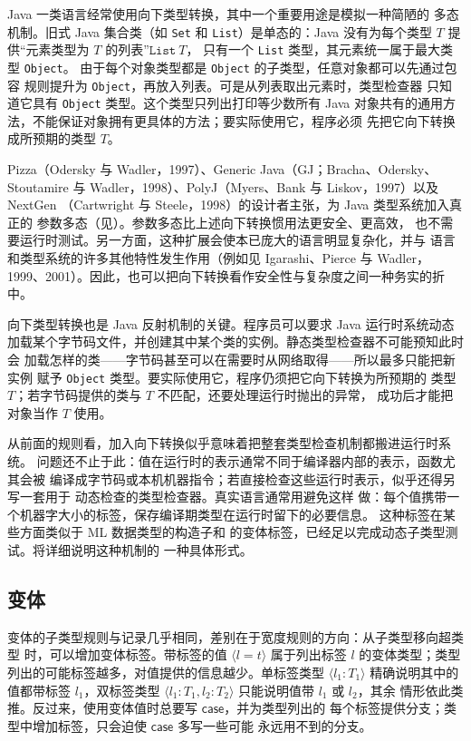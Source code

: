 Java 一类语言经常使用向下类型转换，其中一个重要用途是模拟一种简陋的
多态机制。旧式 Java 集合类（如 \texttt{Set} 和 \texttt{List}）是单态的：Java
没有为每个类型 \(T\) 提供“元素类型为 \(T\) 的列表”\(\texttt{List}\ T\)，
只有一个 \texttt{List} 类型，其元素统一属于最大类型 \texttt{Object}。
由于每个对象类型都是 \texttt{Object} 的子类型，任意对象都可以先通过包容
规则提升为 \texttt{Object}，再放入列表。可是从列表取出元素时，类型检查器
只知道它具有 \texttt{Object} 类型。这个类型只列出打印等少数所有 Java
对象共有的通用方法，不能保证对象拥有更具体的方法；要实际使用它，程序必须
先把它向下转换成所预期的类型 \(T\)。

Pizza（Odersky 与 Wadler，1997）、Generic Java（GJ；Bracha、Odersky、
Stoutamire 与 Wadler，1998）、PolyJ（Myers、Bank 与 Liskov，1997）以及 NextGen
（Cartwright 与 Steele，1998）的设计者主张，为 Java 类型系统加入真正的
参数多态（见）。参数多态比上述向下转换惯用法更安全、更高效，
也不需要运行时测试。另一方面，这种扩展会使本已庞大的语言明显复杂化，并与
语言和类型系统的许多其他特性发生作用（例如见 Igarashi、Pierce 与 Wadler，
1999、2001）。因此，也可以把向下转换看作安全性与复杂度之间一种务实的折中。

向下类型转换也是 Java 反射机制的关键。程序员可以要求 Java 运行时系统动态
加载某个字节码文件，并创建其中某个类的实例。静态类型检查器不可能预知此时会
加载怎样的类——字节码甚至可以在需要时从网络取得——所以最多只能把新实例
赋予 \texttt{Object} 类型。要实际使用它，程序仍须把它向下转换为所预期的
类型 \(T\)；若字节码提供的类与 \(T\) 不匹配，还要处理运行时抛出的异常，
成功后才能把对象当作 \(T\) 使用。

从前面的规则看，加入向下转换似乎意味着把整套类型检查机制都搬进运行时系统。
问题还不止于此：值在运行时的表示通常不同于编译器内部的表示，函数尤其会被
编译成字节码或本机机器指令；若直接检查这些运行时表示，似乎还得另写一套用于
动态检查的类型检查器。真实语言通常用避免这样
做：每个值携带一个机器字大小的标签，保存编译期类型在运行时留下的必要信息。
这种标签在某些方面类似于 ML 数据类型的构造子和
的变体标签，已经足以完成动态子类型测试。将详细说明这种机制的
一种具体形式。

\subsection*{变体}

变体的子类型规则与记录几乎相同，差别在于宽度规则的方向：从子类型移向超类型
时，可以增加变体标签。带标签的值 \(\langle l=t\rangle\) 属于列出标签 \(l\)
的变体类型；类型列出的可能标签越多，对值提供的信息越少。单标签类型
\(\langle l_1:T_1\rangle\) 精确说明其中的值都带标签 \(l_1\)，双标签类型
\(\langle l_1:T_1,l_2:T_2\rangle\) 只能说明值带 \(l_1\) 或 \(l_2\)，其余
情形依此类推。反过来，使用变体值时总要写 \(\mathsf{case}\)，并为类型列出的
每个标签提供分支；类型中增加标签，只会迫使 \(\mathsf{case}\) 多写一些可能
永远用不到的分支。

